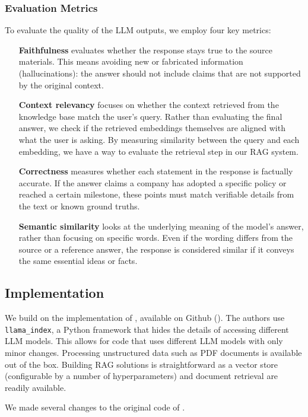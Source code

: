 \documentclass[]{article}
\begin{document}
\subsubsection{Evaluation Metrics}
To evaluate the quality of the LLM outputs, we employ four key metrics:
\begin{itemize}
    \item [\textbf{Faithfulness}] evaluates whether the response stays true to the source materials. This means avoiding new or fabricated information (hallucinations): the answer should not include claims that are not supported by the original context.
    \item [\textbf{Context relevancy}] focuses on whether the context retrieved from the knowledge base match the user’s query. Rather than evaluating the final answer, we check if the retrieved embeddings themselves are aligned with what the user is asking. By measuring similarity between the query and each embedding, we have a way to evaluate the retrieval step in our RAG system.
    \item [\textbf{Correctness}] measures whether each statement in the response is factually accurate. If the answer claims a company has adopted a specific policy or reached a certain milestone, these points must match verifiable details from the text or known ground truths.
    \item [\textbf{Semantic similarity}] looks at the underlying meaning of the model’s answer, rather than focusing on specific words. Even if the wording differs from the source or a reference answer, the response is considered similar if it conveys the same essential ideas or facts.
\end{itemize}

\subsection{Implementation}

We build on the implementation of \cite{durability}, available on Github (\cite{github-orig}).
The authors use \texttt{llama\_index}, a Python framework that hides the details of accessing different LLM models.
This allows for code that uses different LLM models with only minor changes.
Processing unstructured data such as PDF documents is available out of the box.
Building RAG solutions is straightforward as a vector store (configurable by a number of hyperparameters) and document retrieval are readily available.

We made several changes to the original code of \cite{durability}.
\end{document}

